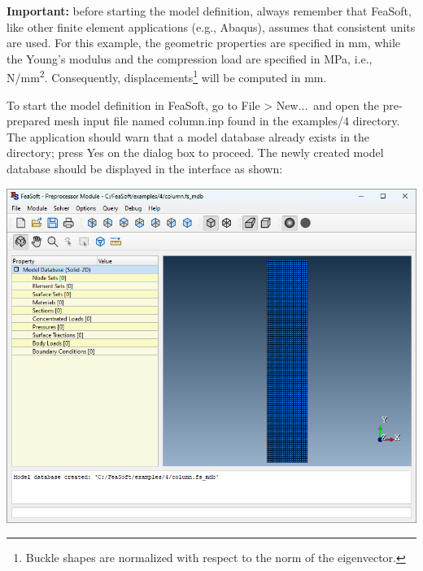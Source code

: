 \documentclass[
    11pt,        %
    a4paper,     %
    final,       %
    fleqn,       %
    notitlepage, %
    onecolumn,   %
    oneside,     %
]{article}
\begin{document}
\textbf{Important:} before starting the model definition, always remember that FeaSoft, like other finite element applications (e.g., Abaqus), assumes that consistent units are used. For this example, the geometric properties are specified in mm, while the Young's modulus and the compression load are specified in MPa, i.e., N/mm\textsuperscript{2}. Consequently, displacements\footnote{Buckle shapes are normalized with respect to the norm of the eigenvector.} will be computed in mm.

To start the model definition in FeaSoft, go to File > New...\ and open the pre-prepared mesh input file named column.inp found in the examples/4 directory. The application should warn that a model database already exists in the directory; press Yes on the dialog box to proceed. The newly created model database should be displayed in the interface as shown:
\begin{center}
    \includegraphics[scale=0.5]{fig/ui-4-1.png}
\end{center}
\end{document}
